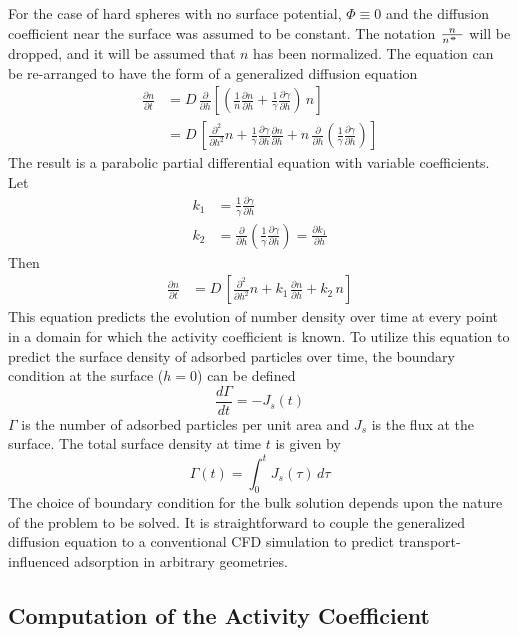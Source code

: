 For the case of hard spheres with no surface potential, $\Phi\equiv0$
and the diffusion coefficient near the surface was assumed to be constant.
The notation \( \frac{n}{n^\standardstate} \) will be dropped, and
it will be assumed that $n$ has been normalized. The equation can
be re-arranged to have the form of a generalized diffusion equation\begin{align}
\frac{\partial n}{\partial t} & =D\,\frac{\partial}{\partial h}\left[\left(\frac{1}{n}\frac{\partial n}{\partial h}+\frac{1}{\gamma}\frac{\partial\gamma}{\partial h}\right)\, n\right]\nonumber \\
 & =D\,\left[\frac{\partial^{2}}{\partial h^{2}}n+\frac{1}{\gamma}\frac{\partial\gamma}{\partial h}\frac{\partial n}{\partial h}+n\,\frac{\partial}{\partial h}\left(\frac{1}{\gamma}\frac{\partial\gamma}{\partial h}\right)\right]\label{eq:Generalized Diffusion Eqn}\end{align}
The result is a parabolic partial differential equation with variable
coefficients. Let\begin{align}
k_{1} & =\frac{1}{\gamma}\frac{\partial\gamma}{\partial h}\nonumber \\
k_{2} & =\frac{\partial}{\partial h}\left(\frac{1}{\gamma}\frac{\partial\gamma}{\partial h}\right)=\frac{\partial k_{1}}{\partial h}\label{eq:Variable coefficients}\end{align}
Then\begin{align}
\frac{\partial n}{\partial t} & =D\,\left[\frac{\partial^{2}}{\partial h^{2}}n+k_{1\,}\frac{\partial n}{\partial h}+k_{2}\, n\right]\label{eq:Generalized Diffusion Eqn 1D}\end{align}
 This equation predicts the evolution of number density over time
at every point in a domain for which the activity coefficient is known.
To utilize this equation to predict the surface density of adsorbed
particles over time, the boundary condition at the surface ($h=0$)
can be defined\[
\frac{d\Gamma}{dt}=-J_{s}\left(t\right)\]
$\Gamma$ is the number of adsorbed particles per unit area and $J_{s}$
is the flux at the surface. The total surface density at time $t$
is given by\[
\Gamma\left(t\right)=\int_{0}^{t}J_{s}\left(\tau\right)\, d\tau\]
The choice of boundary condition for the bulk solution depends upon
the nature of the problem to be solved. It is straightforward to couple
the generalized diffusion equation to a conventional CFD simulation
to predict transport-influenced adsorption in arbitrary geometries. 


\subsection{Computation of the Activity Coefficient}

